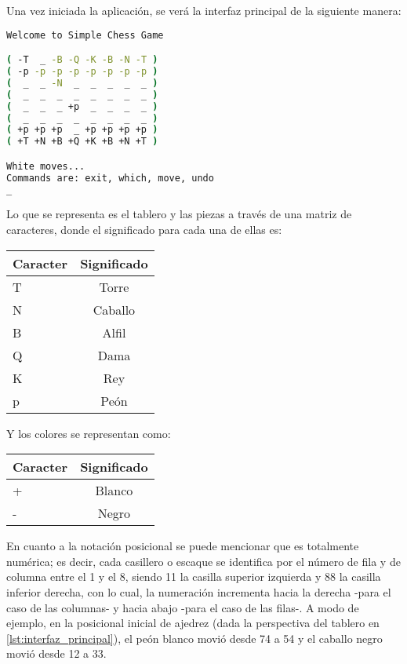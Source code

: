 \documentclass{llncs}
\begin{document}
Una vez iniciada la aplicación, se verá la interfaz principal de la siguiente manera:

\begin{lstlisting}[backgroundcolor=\color{lightgray}, language=bash, caption=Interfaz principal del programa, label={lst:interfaz_principal}]
Welcome to Simple Chess Game

( -T  _ -B -Q -K -B -N -T )
( -p -p -p -p -p -p -p -p )
(  _  _ -N  _  _  _  _  _ )
(  _  _  _  _  _  _  _  _ )
(  _  _  _ +p  _  _  _  _ )
(  _  _  _  _  _  _  _  _ )
( +p +p +p  _ +p +p +p +p )
( +T +N +B +Q +K +B +N +T )

White moves...
Commands are: exit, which, move, undo
_
\end{lstlisting}

Lo que se representa es el tablero y las piezas a través de una matriz de caracteres, donde el significado para cada una de ellas es:
\newline

\setlength{\tabcolsep}{20pt}
\begin{tabular}{ l | c }
  Caracter & Significado \\
  \hline
  T & Torre \\
  N & Caballo \\
  B & Alfil \\
  Q & Dama \\
  K & Rey \\
  p & Peón \\
\end{tabular}
\newline
\newline

Y los colores se representan como:
\newline

\setlength{\tabcolsep}{20pt}
\begin{tabular}{ l | c }
  Caracter & Significado \\
  \hline
  + & Blanco \\
  - & Negro \\
\end{tabular}
\newline
\newline

En cuanto a la notación posicional se puede mencionar que es totalmente numérica; es decir, cada casillero o escaque se identifica por el número de fila y de columna entre el 1 y el 8, siendo 11 la casilla superior izquierda y 88 la casilla inferior derecha, con lo cual, la numeración incrementa hacia la derecha -para el caso de las columnas- y hacia abajo -para el caso de las filas-. A modo de ejemplo, en la posicional inicial de ajedrez (dada la perspectiva del tablero en \ref{lst:interfaz_principal}), el peón blanco movió desde 74 a 54 y el caballo negro movió desde 12 a 33.
\end{document}
